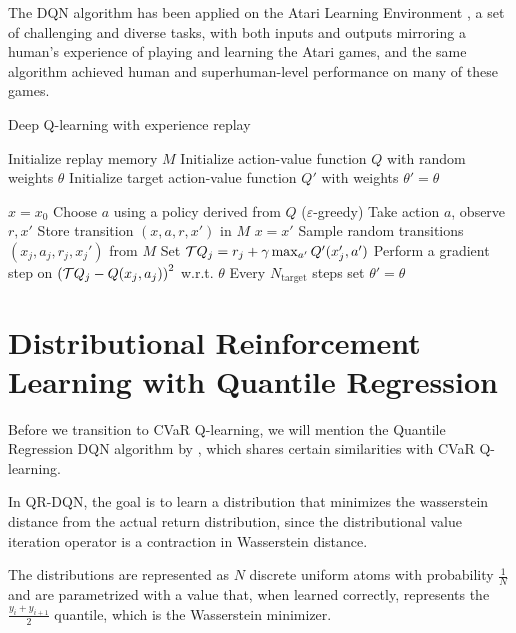 The DQN algorithm has been applied on the Atari Learning Environment \citep{bellemare13arcade}, a set of challenging and diverse tasks, with both inputs and outputs mirroring a human's experience of playing and learning the Atari games, and the same algorithm achieved human and superhuman-level performance on many of these games.

\begin{algorithm}
\caption{Deep Q-learning with experience replay}
\begin{algorithmic}\label{alg:dqn}

    \STATE Initialize replay memory $M$
    \STATE Initialize action-value function $Q$ with random weights $\theta$
    \STATE Initialize target action-value function $Q'$ with weights $\theta'=\theta$

    \STATE $x=x_0$
	\STATE Choose $a$ using a policy derived from $Q$ ($\varepsilon$-greedy)
	\STATE Take action $a$, observe $r, x'$
	\STATE Store transition $(x, a, r, x')$ in $M$
	\STATE $x = x'$
	\STATE Sample random transitions $(x_j, a_j, r_j, x_j')$ from $M$
	\STATE Set $\mathcal{T} Q_j=r_j + \gamma \max_{a'} Q'(x_j', a')$
    \STATE Perform a gradient step on $\left( {\mathcal{T} Q_j - Q(x_j, a_j)} \right)^2$ w.r.t. $\theta$
    \STATE Every $N_\text{target}$ steps set $\theta'=\theta$
	\ENDWHILE
	\ENDFOR
	
\end{algorithmic}
\end{algorithm}

\section{Distributional Reinforcement Learning with Quantile Regression}\label{sec:dqn:qrdqn}
Before we transition to CVaR Q-learning, we will mention the Quantile Regression DQN algorithm by \citet{dabney2017distributional}, which shares certain similarities with CVaR Q-learning.

In QR-DQN, the goal is to learn a distribution that minimizes the wasserstein distance from the actual return distribution, since the distributional value iteration operator is a contraction in Wasserstein distance. 

The distributions are represented as $N$ discrete uniform atoms with probability $\frac{1}{N}$ and are parametrized with a value that, when learned correctly, represents the $\frac{y_{i}+y_{i+1}}{2}$ quantile, which is the Wasserstein minimizer.

